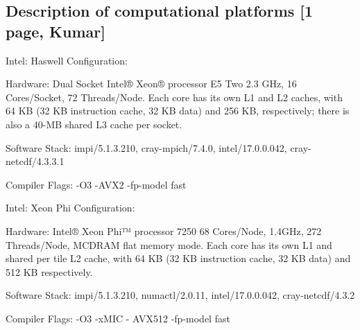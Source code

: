 \subsection{Description of computational platforms [1 page, Kumar]}\label{sec:platform}

Intel: Haswell Configuration:

Hardware: Dual Socket Intel® Xeon® processor E5
Two 2.3 GHz, 16 Cores/Socket, 72 Threads/Node. Each core has its own L1 and L2 caches, with 64 KB (32 KB instruction cache, 32 KB data) and 256 KB, respectively; there is also a 40-MB shared L3 cache per socket.

Software Stack: impi/5.1.3.210, cray-mpich/7.4.0, intel/17.0.0.042, cray-netcdf/4.3.3.1

Compiler Flags: -O3 -AVX2 -fp-model fast

Intel: Xeon Phi Configuration:

Hardware: Intel® Xeon Phi™ processor 7250 
68 Cores/Node, 1.4GHz, 272 Threads/Node, MCDRAM flat memory mode. Each core has its own L1 and shared per tile L2 cache, with 64 KB (32 KB instruction cache, 32 KB data) and 512 KB respectively.

Software Stack: impi/5.1.3.210, numactl/2.0.11, intel/17.0.0.042, cray-netcdf/4.3.2

Compiler Flags: -O3 -xMIC - AVX512 -fp-model fast




